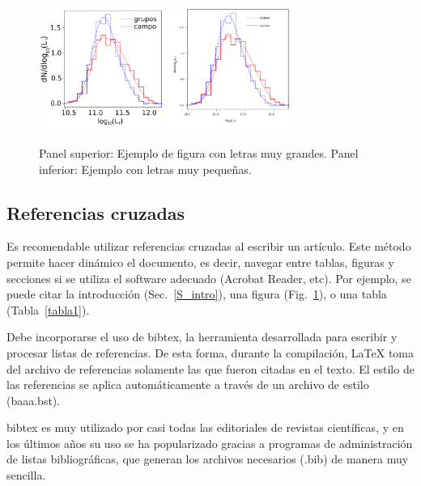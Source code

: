 \documentclass[baaa]{baaa}
\begin{document}
\begin{figure}[!t]
  \centering
  \includegraphics[width=0.36\textwidth]{ejemplo_fig01.pdf}
  \includegraphics[width=0.36\textwidth]{ejemplo_fig02.pdf}
  \caption{Panel superior: Ejemplo de figura con letras muy grandes.
           Panel inferior: Ejemplo con letras muy pequeñas.
}
  \label{F_letras}
\end{figure}

\subsection{Referencias cruzadas}
\label{ref}

Es recomendable utilizar referencias cruzadas al escribir un artículo. Este método permite hacer dinámico el documento, es decir, navegar entre tablas, figuras y secciones si se utiliza el software adecuado (Acrobat Reader, etc). Por ejemplo, se puede citar la introducción (Sec.~\ref{S_intro}), una figura (Fig.~\ref{F_letras}), o una tabla (Tabla~\ref{tabla1}).

Debe incorporarse el uso de {\sc bibtex}, la herramienta desarrollada para escribir y procesar listas de referencias. De esta forma, durante la compilación, \LaTeX{} toma del archivo de referencias solamente las que fueron citadas en el texto. El estilo de las referencias se aplica automáticamente a través de un archivo de estilo (baaa.bst).

{\sc bibtex} es muy utilizado por casi todas las editoriales de revistas científicas, y en los últimos años su uso se ha popularizado gracias a programas de administración de listas bibliográficas, que generan los archivos necesarios (.bib) de manera muy sencilla.
\end{document}
